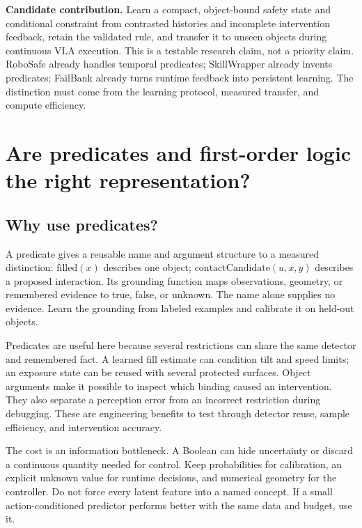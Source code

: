\documentclass[10pt]{article}
\begin{document}
\textbf{Candidate contribution.} Learn a compact, object-bound safety state and conditional constraint from contrasted histories and incomplete intervention feedback, retain the validated rule, and transfer it to unseen objects during continuous VLA execution. This is a testable research claim, not a priority claim. RoboSafe already handles temporal predicates; SkillWrapper already invents predicates; FailBank already turns runtime feedback into persistent learning. The distinction must come from the learning protocol, measured transfer, and compute efficiency.

\section{Are predicates and first-order logic the right representation?}

\subsection{Why use predicates?}
A predicate gives a reusable name and argument structure to a measured distinction: $\mathrm{filled}(x)$ describes one object; $\mathrm{contactCandidate}(u,x,y)$ describes a proposed interaction. Its grounding function maps observations, geometry, or remembered evidence to true, false, or unknown. The name alone supplies no evidence. Learn the grounding from labeled examples and calibrate it on held-out objects.

Predicates are useful here because several restrictions can share the same detector and remembered fact. A learned fill estimate can condition tilt and speed limits; an exposure state can be reused with several protected surfaces. Object arguments make it possible to inspect which binding caused an intervention. They also separate a perception error from an incorrect restriction during debugging. These are engineering benefits to test through detector reuse, sample efficiency, and intervention accuracy.

The cost is an information bottleneck. A Boolean can hide uncertainty or discard a continuous quantity needed for control. Keep probabilities for calibration, an explicit unknown value for runtime decisions, and numerical geometry for the controller. Do not force every latent feature into a named concept. If a small action-conditioned predictor performs better with the same data and budget, use it.
\end{document}

